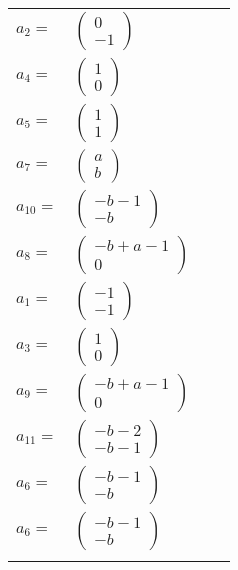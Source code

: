 \documentclass[1p]{elsarticle_modified}
\theoremstyle{definition}
\begin{document}
\begin{tabular}{m{7pt} m{180pt} m{7pt} m{180pt} }
\flushright $a_{2}=$&$\begin{pmatrix}0\\-1\end{pmatrix}$ \\
\flushright $a_{4}=$&$\begin{pmatrix}1\\0\end{pmatrix}$ \\
\flushright $a_{5}=$&$\begin{pmatrix}1\\1\end{pmatrix}$ \\
\flushright $a_{7}=$&$\begin{pmatrix}a\\b\end{pmatrix}$ \\
\flushright $a_{10}=$&$\begin{pmatrix}- b-1\\- b\end{pmatrix}$ \\
\flushright $a_{8}=$&$\begin{pmatrix}- b+a-1\\0\end{pmatrix}$ \\
\flushright $a_{1}=$&$\begin{pmatrix}-1\\-1\end{pmatrix}$ \\
\flushright $a_{3}=$&$\begin{pmatrix}1\\0\end{pmatrix}$ \\
\flushright $a_{9}=$&$\begin{pmatrix}- b+a-1\\0\end{pmatrix}$ \\
\flushright $a_{11}=$&$\begin{pmatrix}- b-2\\- b-1\end{pmatrix}$ \\
\flushright $a_{6}=$&$\begin{pmatrix}- b-1\\- b\end{pmatrix}$\\ \flushright $a_{6}=$&$\begin{pmatrix}- b-1\\- b\end{pmatrix}$\\&\end{tabular}
\end{document}
